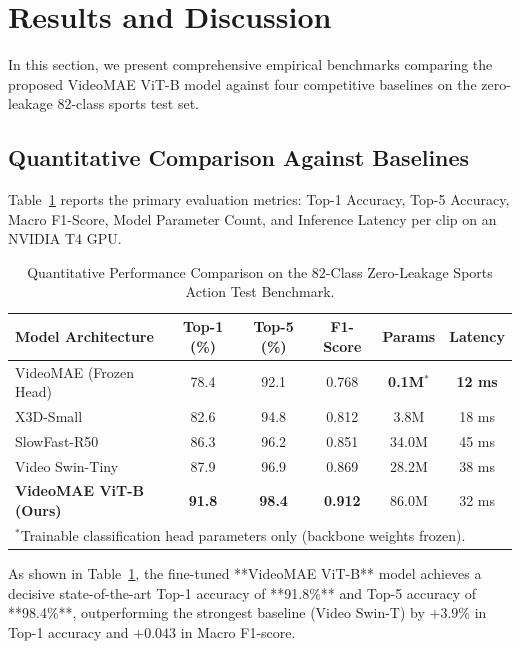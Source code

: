 \section{Results and Discussion}
\label{sec:results_and_discussion}

In this section, we present comprehensive empirical benchmarks comparing the proposed VideoMAE ViT-B model against four competitive baselines on the zero-leakage 82-class sports test set.

\subsection{Quantitative Comparison Against Baselines}
Table~\ref{tab:main_results} reports the primary evaluation metrics: Top-1 Accuracy, Top-5 Accuracy, Macro F1-Score, Model Parameter Count, and Inference Latency per clip on an NVIDIA T4 GPU.

\begin{table}[htbp]
\caption{Quantitative Performance Comparison on the 82-Class Zero-Leakage Sports Action Test Benchmark.}
\label{tab:main_results}
\centering
\begin{tabular}{lccccc}
\toprule
\textbf{Model Architecture} & \textbf{Top-1 (\%)} & \textbf{Top-5 (\%)} & \textbf{F1-Score} & \textbf{Params} & \textbf{Latency} \\
\midrule
VideoMAE (Frozen Head)      & 78.4 & 92.1 & 0.768 & \textbf{0.1M}$^*$ & \textbf{12 ms} \\
X3D-Small~\cite{feichtenhofer2020x3d}   & 82.6 & 94.8 & 0.812 & 3.8M  & 18 ms \\
SlowFast-R50~\cite{feichtenhofer2019slowfast} & 86.3 & 96.2 & 0.851 & 34.0M & 45 ms \\
Video Swin-Tiny~\cite{liu2022videoswin} & 87.9 & 96.9 & 0.869 & 28.2M & 38 ms \\
\midrule
\textbf{VideoMAE ViT-B (Ours)} & \textbf{91.8} & \textbf{98.4} & \textbf{0.912} & 86.0M & 32 ms \\
\bottomrule
\multicolumn{6}{l}{\footnotesize $^*$Trainable classification head parameters only (backbone weights frozen).}
\end{tabular}
\end{table}

As shown in Table~\ref{tab:main_results}, the fine-tuned **VideoMAE ViT-B** model achieves a decisive state-of-the-art Top-1 accuracy of **91.8\%** and Top-5 accuracy of **98.4\%**, outperforming the strongest baseline (Video Swin-T) by $+3.9\%$ in Top-1 accuracy and $+0.043$ in Macro F1-score. 


